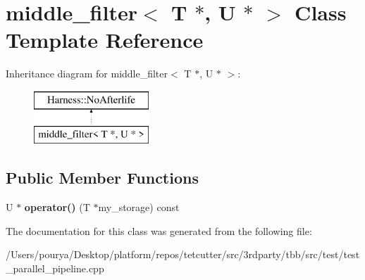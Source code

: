 \hypertarget{classmiddle__filter_3_01T_01_5_00_01U_01_5_01_4}{}\section{middle\+\_\+filter$<$ T $\ast$, U $\ast$ $>$ Class Template Reference}
\label{classmiddle__filter_3_01T_01_5_00_01U_01_5_01_4}
Inheritance diagram for middle\+\_\+filter$<$ T $\ast$, U $\ast$ $>$\+:\begin{figure}[H]
\begin{center}
\leavevmode
\includegraphics[height=2.000000cm]{classmiddle__filter_3_01T_01_5_00_01U_01_5_01_4}
\end{center}
\end{figure}
\subsection*{Public Member Functions}
\begin{DoxyCompactItemize}
\item 
\hypertarget{classmiddle__filter_3_01T_01_5_00_01U_01_5_01_4_a47384b5f1dae477ee06d2a730da8517b}{}U $\ast$ {\bfseries operator()} (T $\ast$my\+\_\+storage) const \label{classmiddle__filter_3_01T_01_5_00_01U_01_5_01_4_a47384b5f1dae477ee06d2a730da8517b}

\end{DoxyCompactItemize}


The documentation for this class was generated from the following file\+:\begin{DoxyCompactItemize}
\item 
/\+Users/pourya/\+Desktop/platform/repos/tetcutter/src/3rdparty/tbb/src/test/test\+\_\+parallel\+\_\+pipeline.\+cpp\end{DoxyCompactItemize}
